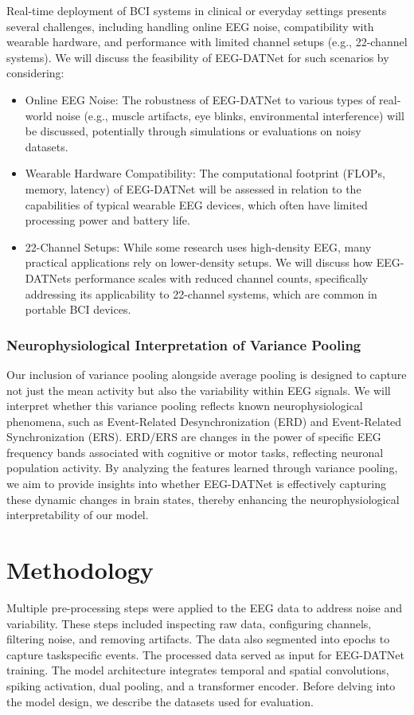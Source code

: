 \documentclass[pdflatex,sn-mathphys-num]{sn-jnl}
\theoremstyle{thmstyleone}%
\theoremstyle{thmstyletwo}%
\theoremstyle{thmstylethree}%
\begin{document}
Real-time deployment of BCI systems in clinical or everyday settings presents several challenges, including handling online EEG noise, compatibility with wearable hardware, and performance with limited channel setups (e.g., 22-channel systems). We will discuss the feasibility of EEG-DATNet for such scenarios by considering:
\begin{itemize}
\item Online EEG Noise: The robustness of EEG-DATNet to various types of real-world noise (e.g., muscle artifacts, eye blinks, environmental interference) will be discussed, potentially through simulations or evaluations on noisy datasets.
\item Wearable Hardware Compatibility: The computational footprint (FLOPs, memory, latency) of EEG-DATNet will be assessed in relation to the capabilities of typical wearable EEG devices, which often have limited processing power and battery life.
\item 22-Channel Setups: While some research uses high-density EEG, many practical applications rely on lower-density setups. We will discuss how EEG-DATNet\textquotesingle s performance scales with reduced channel counts, specifically addressing its applicability to 22-channel systems, which are common in portable BCI devices.
\end{itemize}

\subsubsection{Neurophysiological Interpretation of Variance Pooling}

Our inclusion of variance pooling alongside average pooling is designed to capture not just the mean activity but also the variability within EEG signals. We will interpret whether this variance pooling reflects known neurophysiological phenomena, such as Event-Related Desynchronization (ERD) and Event-Related Synchronization (ERS). ERD/ERS are changes in the power of specific EEG frequency bands associated with cognitive or motor tasks, reflecting neuronal population activity. By analyzing the features learned through variance pooling, we aim to provide insights into whether EEG-DATNet is effectively capturing these dynamic changes in brain states, thereby enhancing the neurophysiological interpretability of our model.

\section{Methodology}
Multiple pre-processing steps were applied to the EEG data to address noise and
variability. These steps included inspecting raw data, configuring channels, filtering
noise, and removing artifacts. The data also segmented into epochs to capture taskspecific events. The processed data served as input for EEG-DATNet training. The
model architecture integrates temporal and spatial convolutions, spiking activation,
dual pooling, and a transformer encoder. Before delving into the model design, we
describe the datasets used for evaluation.
\end{document}
